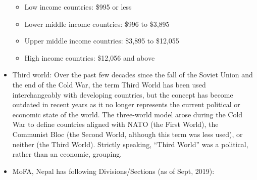 \documentclass[
]{book}
\providecommand{\tightlist}{%
  \setlength{\itemsep}{0pt}\setlength{\parskip}{0pt}}
\begin{document}
\begin{itemize}
  \begin{itemize}
  \tightlist
  \item
    Low income countries: \$995 or less
  \item
    Lower middle income countries: \$996 to \$3,895
  \item
    Upper middle income countries: \$3,895 to \$12,055
  \item
    High income countries: \$12,056 and above
  \end{itemize}
\item
  Third world:
  Over the past few decades since the fall of the Soviet Union and the end of the Cold War, the term Third World has been used interchangeably with developing countries, but the concept has become outdated in recent years as it no longer represents the current political or economic state of the world. The three-world model arose during the Cold War to define countries aligned with NATO (the First World), the Communist Bloc (the Second World, although this term was less used), or neither (the Third World). Strictly speaking, ``Third World'' was a political, rather than an economic, grouping.
\item
  MoFA, Nepal has following Divisions/Sections (as of Sept, 2019):


\end{itemize}
\end{document}
